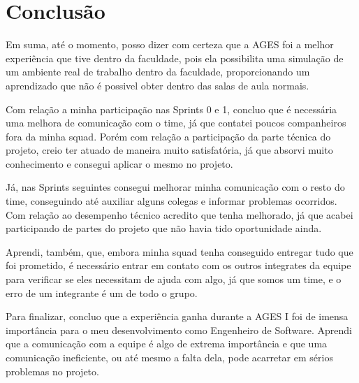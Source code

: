 \section[Conclusão]{Conclusão}

Em suma, até o momento, posso dizer com certeza que a AGES foi a melhor experiência que tive dentro da faculdade, pois ela possibilita uma simulação de um ambiente real de trabalho dentro da faculdade, proporcionando um aprendizado que não é possivel obter dentro das salas de aula normais.

Com relação a minha participação nas Sprints 0 e 1, concluo que é necessária uma melhora de comunicação com o time, já que contatei poucos companheiros fora da minha squad. Porém com relação a participação da parte técnica do projeto, creio ter atuado de maneira muito satisfatória, já que absorvi muito conhecimento e consegui aplicar o mesmo no projeto.

Já, nas Sprints seguintes consegui melhorar minha comunicação com o resto do time, conseguindo até auxiliar alguns colegas e informar problemas ocorridos. Com relação ao desempenho técnico acredito que tenha melhorado, já que acabei participando de partes do projeto que não havia tido oportunidade ainda.

Aprendi, também, que, embora minha squad tenha conseguido entregar tudo que foi prometido, é necessário entrar em contato com os outros integrates da equipe para verificar se eles necessitam de ajuda com algo, já que somos um time, e o erro de um integrante é um de todo o grupo.

Para finalizar, concluo que a experiência ganha durante a AGES I foi de imensa importância para o meu desenvolvimento como Engenheiro de Software. Aprendi que a comunicação com a equipe é algo de extrema importância e que uma comunicação ineficiente, ou até mesmo a falta dela, pode acarretar em sérios problemas no projeto.